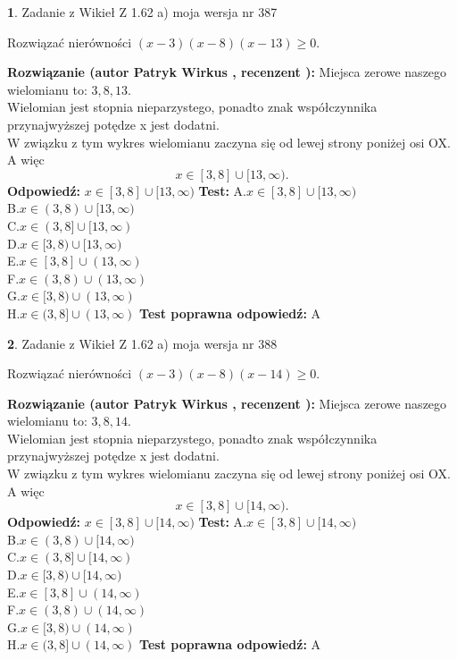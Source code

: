 \documentclass[12pt, a4paper]{article}
\theoremstyle{definition} %
\newtheorem{zad}{}
\newcommand{\zadStart}[1]{\begin{zad}#1\newline}
\newcommand{\zadStop}{\end{zad}}
\newcommand{\rozwStart}[2]{\noindent \textbf{Rozwiązanie (autor #1 , recenzent #2): }\newline}
\newcommand{\rozwStop}{\newline}
\newcommand{\odpStart}{\noindent \textbf{Odpowiedź:}\newline}
\newcommand{\odpStop}{\newline}
\newcommand{\testStart}{\noindent \textbf{Test:}\newline}
\newcommand{\testStop}{\newline}
\newcommand{\kluczStart}{\noindent \textbf{Test poprawna odpowiedź:}\newline}
\newcommand{\kluczStop}{\newline}
\begin{document}
\zadStart{Zadanie z Wikieł Z 1.62 a) moja wersja nr 387}

Rozwiązać nierówności $(x-3)(x-8)(x-13)\ge0$.
\zadStop
\rozwStart{Patryk Wirkus}{}
Miejsca zerowe naszego wielomianu to: $3, 8, 13$.\\
Wielomian jest stopnia nieparzystego, ponadto znak współczynnika przy\linebreak najwyższej potędze x jest dodatni.\\ W związku z tym wykres wielomianu zaczyna się od lewej strony poniżej osi OX. A więc $$x \in [3,8] \cup [13,\infty).$$
\rozwStop
\odpStart
$x \in [3,8] \cup [13,\infty)$
\odpStop
\testStart
A.$x \in [3,8] \cup [13,\infty)$\\
B.$x \in (3,8) \cup [13,\infty)$\\
C.$x \in (3,8] \cup [13,\infty)$\\
D.$x \in [3,8) \cup [13,\infty)$\\
E.$x \in [3,8] \cup (13,\infty)$\\
F.$x \in (3,8) \cup (13,\infty)$\\
G.$x \in [3,8) \cup (13,\infty)$\\
H.$x \in (3,8] \cup (13,\infty)$
\testStop
\kluczStart
A
\kluczStop



\zadStart{Zadanie z Wikieł Z 1.62 a) moja wersja nr 388}

Rozwiązać nierówności $(x-3)(x-8)(x-14)\ge0$.
\zadStop
\rozwStart{Patryk Wirkus}{}
Miejsca zerowe naszego wielomianu to: $3, 8, 14$.\\
Wielomian jest stopnia nieparzystego, ponadto znak współczynnika przy\linebreak najwyższej potędze x jest dodatni.\\ W związku z tym wykres wielomianu zaczyna się od lewej strony poniżej osi OX. A więc $$x \in [3,8] \cup [14,\infty).$$
\rozwStop
\odpStart
$x \in [3,8] \cup [14,\infty)$
\odpStop
\testStart
A.$x \in [3,8] \cup [14,\infty)$\\
B.$x \in (3,8) \cup [14,\infty)$\\
C.$x \in (3,8] \cup [14,\infty)$\\
D.$x \in [3,8) \cup [14,\infty)$\\
E.$x \in [3,8] \cup (14,\infty)$\\
F.$x \in (3,8) \cup (14,\infty)$\\
G.$x \in [3,8) \cup (14,\infty)$\\
H.$x \in (3,8] \cup (14,\infty)$
\testStop
\kluczStart
A
\kluczStop
\end{document}
